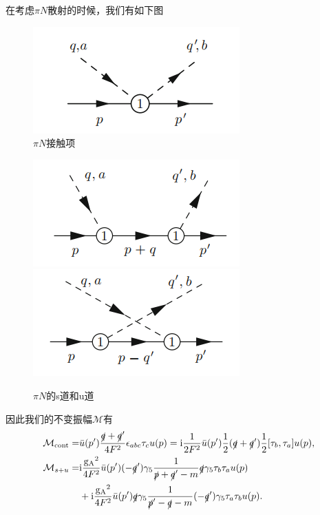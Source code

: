 \documentclass[aps,tightenlines,16pt]{ctexart}
\numberwithin{equation}{section}
\begin{document}
在考虑$\pi N$散射的时候，我们有如下图
\begin{figure}[h]
   \centering
   \includegraphics{pin4.png}\caption{$\pi N$接触项}
\end{figure}
\begin{figure}[h]
   \centering
   \includegraphics{pin3s.png}
   \includegraphics{pin3u.png}\caption{$\pi N$的s道和u道}
\end{figure}
因此我们的不变振幅$\mathcal{M}$有
\begin{align}
   \begin{aligned}
   \mathcal{M}_{\text{cont}}=&\bar{u}(p^{\prime})\frac{\slashed{q}+\slashed{q}^{\prime}}{4F^2}\epsilon_{abc}\tau_c u(p) = \mbox{i}\frac{1}{2F^2}\bar{u}(p^{\prime})\frac{1}{2}(\slashed{q}+\slashed{q}^{\prime})\frac{1}{2}[\tau_b,\tau_a]u(p),\\
   \mathcal{M}_{s+u}=&\mbox{i}\frac{\mathrm{g_A}^2}{4F^2}\bar{u}(p^{\prime})(-\slashed{q}^{\prime})\gamma_5\frac{1}{\slashed{p}+\slashed{q}^{\prime}-m}\slashed{q}\gamma_5\tau_b\tau_a u(p)\\
   &+\mbox{i}\frac{\mathrm{g_A}^2}{4F^2}\bar{u}(p^{\prime})\slashed{q}\gamma_5\frac{1}{\slashed{p}^{\prime}-\slashed{q}-m}(-\slashed{q}^{\prime})\gamma_5\tau_a\tau_b u(p).
   \end{aligned}
\end{align}
\end{document}
